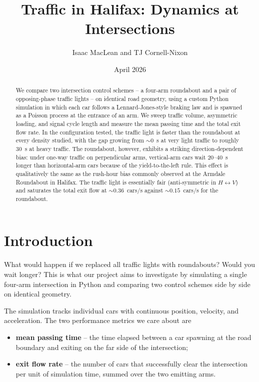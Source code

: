 \documentclass[11pt]{article}
\title{Traffic in Halifax: Dynamics at Intersections}
\author{Isaac MacLean and TJ Cornell-Nixon}
\date{April 2026}
\begin{document}
\maketitle

\begin{abstract}
We compare two intersection control schemes -- a four-arm roundabout and a pair of opposing-phase traffic lights -- on identical road geometry, using a custom Python simulation in which each car follows a Lennard-Jones-style braking law and is spawned as a Poisson process at the entrance of an arm. We sweep traffic volume, asymmetric loading, and signal cycle length and measure the mean passing time and the total exit flow rate. In the configuration tested, the traffic light is faster than the roundabout at every density studied, with the gap growing from $\sim 0$~s at very light traffic to roughly $30$~s at heavy traffic. The roundabout, however, exhibits a striking direction-dependent bias: under one-way traffic on perpendicular arms, vertical-arm cars wait $20$--$40$~s longer than horizontal-arm cars because of the yield-to-the-left rule. This effect is qualitatively the same as the rush-hour bias commonly observed at the Armdale Roundabout in Halifax. The traffic light is essentially fair (anti-symmetric in $H \leftrightarrow V$) and saturates the total exit flow at $\sim 0.36$~cars/s against $\sim 0.15$~cars/s for the roundabout.
\end{abstract}

\tableofcontents
\newpage

\section{Introduction}
What would happen if we replaced all traffic lights with roundabouts? Would you wait longer? This is what our project aims to investigate by simulating a single four-arm intersection in Python and comparing two control schemes side by side on identical geometry.

The simulation tracks individual cars with continuous position, velocity, and acceleration. The two performance metrics we care about are
\begin{itemize}
    \item \textbf{mean passing time} -- the time elapsed between a car spawning at the road boundary and exiting on the far side of the intersection;
    \item \textbf{exit flow rate} -- the number of cars that successfully clear the intersection per unit of simulation time, summed over the two emitting arms.
\end{itemize}
\end{document}

